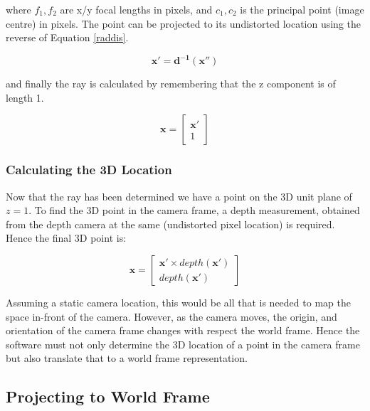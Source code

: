 \documentclass[a4paper,11pt,notitlepage]{article}
\begin{document}
where $f_{1},f_{2}$ are x/y focal lengths in pixels, and $c_{1},c_{2}$ is the principal point (image centre) in pixels. The point can be projected to its undistorted location using the reverse of Equation \ref{raddis}.

\begin{equation}
\mathbf{x'} = \mathbf{d^{-1}(x'')}
\label{camera_scale2}
\end{equation}

and finally the ray is calculated by remembering that the z component is of length 1.

\begin{equation}
\mathbf{x} = 
\begin{bmatrix}
\mathbf{x'} \\
1
\end{bmatrix}
\label{to_3d_ray}
\end{equation}

\subsubsection{Calculating the 3D Location}

Now that the ray has been determined we have a point on the 3D unit plane of $z=1$. To find the 3D point in the camera frame, a depth measurement, obtained from the depth camera at the same (undistorted pixel location) is required. Hence the final 3D point is:

\begin{equation}
\mathbf{x} = 
\begin{bmatrix}
\mathbf{x'} \times depth(\mathbf{x'})\\
depth(\mathbf{x'})
\end{bmatrix}
\label{camera_add_depth}
\end{equation}

Assuming a static camera location, this would be all that is needed to map the space in-front of the camera. However, as the camera moves, the origin, and orientation of the camera frame changes with respect the world frame. Hence the software must not only determine the 3D location of a point in the camera frame but also translate that to a world frame representation.

\subsection{Projecting to World Frame}
\end{document}

